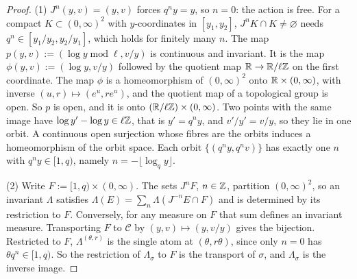 \begin{proof}
(1) $J^n(y,v) = (y,v)$ forces $q^ny = y$, so $n = 0$: the action is free. For a compact
$K \subset (0,\infty)^2$ with $y$-coordinates in $[y_1, y_2]$, $J^nK \cap K \ne \varnothing$ needs
$q^n \in [y_1/y_2, y_2/y_1]$, which holds for finitely many $n$. The map
$p(y,v) := (\log y \operatorname{mod} \ell, v/y)$ is continuous and invariant. It is the map
$\phi(y,v) := (\log y, v/y)$ followed by the quotient map $\mathbb{R} \to \mathbb{R}/\ell\mathbb{Z}$ on the first
coordinate. The map $\phi$ is a homeomorphism of $(0,\infty)^2$ onto $\mathbb{R} \times (0,\infty)$, with
inverse $(u, r) \mapsto (e^u, re^u)$, and the quotient map of a topological group is open. So $p$
is open, and it is onto $(\mathbb{R}/\ell\mathbb{Z}) \times (0,\infty)$. Two points with the same image have
$\log y' - \log y \in \ell\mathbb{Z}$, that is $y' = q^ny$, and $v'/y' = v/y$, so they lie in one orbit.
A continuous open surjection whose fibres are the orbits induces a homeomorphism of the orbit space.
Each orbit $\{(q^ny, q^nv)\}$ has exactly one $n$ with $q^ny \in [1,q)$, namely
$n = -\lfloor\log_qy\rfloor$.

(2) Write $F := [1,q) \times (0,\infty)$. The sets $J^nF$, $n \in \mathbb{Z}$, partition $(0,\infty)^2$, so
an invariant $\Lambda$ satisfies $\Lambda(E) = \sum_n\Lambda(J^{-n}E \cap F)$ and is determined by
its restriction to $F$. Conversely, for any measure on $F$ that sum defines an invariant measure.
Transporting $F$ to $\mathcal{C}$ by $(y,v) \mapsto (y, v/y)$ gives the bijection. Restricted to $F$,
$\Lambda^{(\theta,r)}$ is the single atom at $(\theta, r\theta)$, since only $n = 0$ has
$\theta q^n \in [1,q)$. So the restriction of $\Lambda_\sigma$ to $F$ is the transport of $\sigma$,
and $\Lambda_\sigma$ is the inverse image.


\end{proof}
